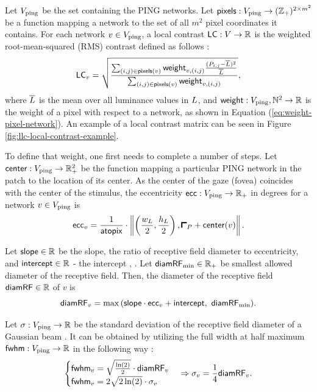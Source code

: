 Let $V_{\mathrm{ping}}$ be the set containing the PING networks. Let $\mathsf{pixels}: V_{\mathrm{ping}} \to (\mathbb{Z}_+)^{2 \times m^2}$ be a function mapping a network to the set of all $m^2$ pixel coordinates it contains.
For each network $v \in V_{\mathrm{ping}}$, a local contrast $\mathsf{LC}: V \to \mathbb{R}$ is the weighted root-mean-squared (RMS) contrast defined as follows \cite{Frazor2006}:
\begin{equation}
    \mathsf{LC}_v = \sqrt{
        \frac{
            \sum_{(i, j) \in \mathsf{pixels}(v)} \mathsf{weight}_{v, (i, j)} \frac{(P_{i, j} - \overline{L})^2}{\overline{L}}
        }{
            \sum_{(i, j) \in \mathsf{pixels}(v)} \mathsf{weight}_{v, (i, j)}
        }
    },
\end{equation}
where $\overline{L}$ is the mean over all luminance values in $L$, and $\mathsf{weight}: V_{\mathrm{ping}}, \mathbb{N}^2 \to \mathbb{R}$ is the weight of a pixel with respect to a network, as shown in Equation (\ref{eq:weight-pixel-network}). An example of a local contrast matrix can be seen in Figure \ref{fig:llc-local-contrast-example}.

To define that weight, one first needs to complete a number of steps.
Let $\mathsf{center} : V_{\mathrm{ping}} \to \mathbb{R}_+^2$ be the function mapping a particular PING network in the patch to the location of its center. As the center of the gaze (fovea) coincides with the center of the stimulus, the eccentricity $\mathsf{ecc}: V_{\mathrm{ping}} \to \mathbb{R}_+$ in degrees for a network $v \in V_{\mathrm{ping}}$ is
\begin{equation}
    \ecc_{v} = \frac{1}{\atopix} \cdot \left\| \left( \frac{\fullwidth}{2}, \frac{\fullheight}{2}   \right), \patchstart + \centr(v) \right\|.
\end{equation}

Let $\mathsf{slope} \in \mathbb{R}$ be the slope, the ratio of receptive field diameter to eccentricity, and $\mathsf{intercept} \in \mathbb{R}$ - the intercept \cite{MaryamPLACEHOLDER}, \cite{Freeman2011}.
Let $\mathsf{diamRF}_{\min} \in \mathbb{R}_+$ be smallest allowed diameter of the receptive field.
Then, the diameter of the receptive field $\mathsf{diamRF} \in \mathbb{R}$ of $v$ is 
\begin{equation}
    \mathsf{diamRF}_v = \max{( \mathsf{slope}\cdot \mathsf{ecc}_v + \mathsf{intercept}, \ \mathsf{diamRF}_{\min} )}.
\end{equation}

Let $\sigma: V_{\mathrm{ping}} \to \mathbb{R}$ be the standard deviation of the receptive field diameter of a Gaussian beam . It can be obtained by utilizing the full width at half maximum $\mathsf{fwhm}: V_{\mathrm{ping}} \to \mathbb{R}$ in the following way \cite{MaryamPLACEHOLDER}:
\begin{equation}
    \begin{cases}
        \mathsf{fwhm}_v = \sqrt{\frac{\ln(2)}{2}} \cdot \mathsf{diamRF}_v \\
        \mathsf{fwhm}_v = 2 \sqrt{2 \ln(2)} \cdot \sigma_v
    \end{cases}
    \Rightarrow 
    \sigma_v = \frac{1}{4} \mathsf{diamRF}_v.
\end{equation}

